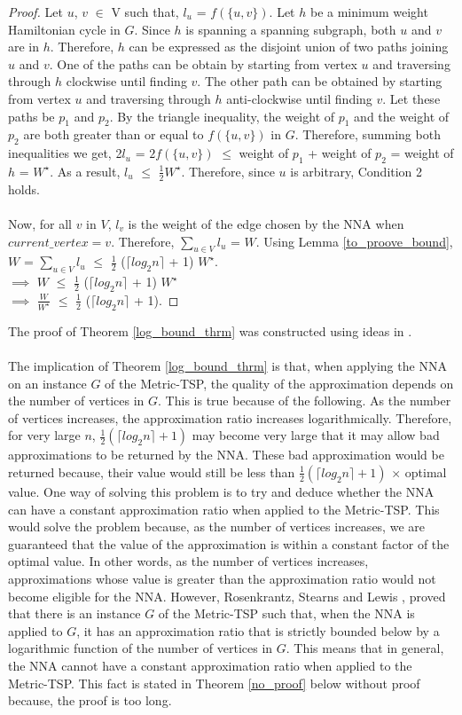 \documentclass[12pt]{article}
\numberwithin{equation}{subsection}
\numberwithin{table}{subsection}
\begin{document}
\begin{proof}
Let  $u$, $v$ $\in$ V such that, $l_u$ = $f(\{u, v\})$. Let $h$ be a minimum weight Hamiltonian cycle in $G$. Since $h$ is spanning a spanning subgraph, both $u$ and $v$ are in $h$. Therefore, $h$ can be expressed as the disjoint union of two paths joining $u$ and $v$. One of the paths can be obtain by starting from vertex $u$ and traversing through $h$ clockwise until finding $v$. The other path can be obtained by starting from vertex $u$ and traversing through $h$ anti-clockwise until finding $v$. Let these paths be $p_1$ and $p_2$. By the triangle inequality, the weight of $p_1$ and the weight of $p_2$ are both greater than or equal to $f(\{u,v\})$ in $G$. Therefore, summing both inequalities we get, 2$l_u$ = $2f(\{u,v\})$ $\leq$ weight of $p_1$ + weight of $p_2$ = weight of $h$ = $W^\star$. As a result, $l_u$ $\leq$ $\frac{1}{2}W^\star$. Therefore, since $u$ is arbitrary, Condition 2 holds.\\\\Now, for all $v$ in $V$, $l_v$ is the weight of the edge chosen by the NNA when $current\_vertex = v$. Therefore, $\sum_{u \in V} l_u $ =  $W$. Using Lemma \ref{to_proove_bound}, $W$ = $\sum_{u \in V} l_u $ $\leq$ $\frac{1}{2}$ ($\lceil log_2 n \rceil$ + 1) $W^\star$.\\ $\implies$ $W$ $\leq$ $\frac{1}{2}$ ($\lceil log_2 n \rceil$ + 1) $W^\star$\\ $\implies$ $\frac{W}{W^\star}$ $\leq$ $\frac{1}{2}$ ($\lceil log_2 n \rceil$ + 1).
\end{proof}
The proof of Theorem \ref{log_bound_thrm} was constructed using ideas in \cite{Rosenkrantz}.\\\\
The implication of Theorem \ref{log_bound_thrm} is that, when applying the NNA on an instance $G$ of the Metric-TSP, the quality of the approximation depends on the number of vertices in $G$. This is true because of the following. As the number of vertices increases, the approximation ratio increases logarithmically. Therefore, for very large $n$, $\frac{1}{2}(\lceil log_2 n \rceil + 1)$ may become very large that it may allow bad approximations to be returned by the NNA. These bad approximation would be returned because, their value would still be less than $\frac{1}{2}(\lceil log_2 n \rceil + 1)$ $\times$ optimal value. One way of solving this problem is to try and deduce whether the NNA can have a constant approximation ratio when applied to the Metric-TSP. This would solve the problem because, as the number of vertices increases, we are guaranteed that the value of the approximation is within a constant factor of the optimal value. In other words, as the number of vertices increases, approximations whose value is greater than the approximation ratio would not become eligible for the NNA. However, Rosenkrantz, Stearns and Lewis \cite{Rosenkrantz}, proved that there is an instance $G$ of the Metric-TSP such that, when the NNA is applied to $G$, it has an approximation ratio that is strictly bounded below by a logarithmic function of the number of vertices in $G$. This means that in general, the NNA cannot have a constant approximation ratio when applied to the Metric-TSP. This fact is stated in Theorem \ref{no_proof} below without proof because, the proof is too long.
\end{document}
